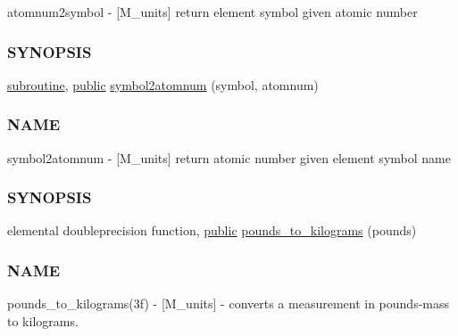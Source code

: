 \begin{DoxyCompactItemize}
\begin{DoxyCompactList}
atomnum2symbol -\/ \mbox{[}M\+\_\+units\mbox{]} return element symbol given atomic number \subsubsection*{S\+Y\+N\+O\+P\+S\+IS}\end{DoxyCompactList}\item 
\hyperlink{M__stopwatch_83_8txt_acfbcff50169d691ff02d4a123ed70482}{subroutine}, \hyperlink{M__stopwatch_83_8txt_a2f74811300c361e53b430611a7d1769f}{public} \hyperlink{namespacem__units_ad6861fff0b83942a7e6b35a274bf2e09}{symbol2atomnum} (symbol, atomnum)
\begin{DoxyCompactList}\small\item\em \subsubsection*{N\+A\+ME}

symbol2atomnum -\/ \mbox{[}M\+\_\+units\mbox{]} return atomic number given element symbol name \subsubsection*{S\+Y\+N\+O\+P\+S\+IS}\end{DoxyCompactList}\item 
elemental doubleprecision function, \hyperlink{M__stopwatch_83_8txt_a2f74811300c361e53b430611a7d1769f}{public} \hyperlink{namespacem__units_a69c8b8d7b442cfbbe70fa384d96bebf0}{pounds\+\_\+to\+\_\+kilograms} (pounds)
\begin{DoxyCompactList}\small\item\em \subsubsection*{N\+A\+ME}

pounds\+\_\+to\+\_\+kilograms(3f) -\/ \mbox{[}M\+\_\+units\mbox{]} -\/ converts a measurement in pounds-\/mass to kilograms. \end{DoxyCompactList}\end{DoxyCompactItemize}
